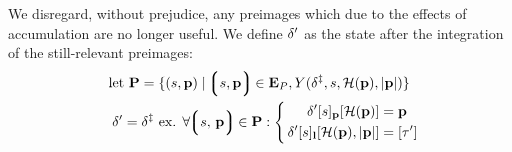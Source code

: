 We disregard, without prejudice, any preimages which due to the effects of accumulation are no longer useful. We define $\delta'$ as the state after the integration of the still-relevant preimages:
\begin{align}
  \using \mathbf{P} = \{
    (s, \mathbf{p})
    \mid
      \tup{s, \mathbf{p}} \in \xtpreimages, Y(\accountspostxfer, s, \blake(\mathbf{p}), \len{\mathbf{p}})
    \}\\
  \accountspostpreimage = \accountspostxfer \text{ ex. } \forall \tup{s,\,\mathbf{p}} \in \mathbf{P} : \left\{\,\begin{aligned}
      \quad\accountspostpreimage[s]_\mathbf{p}[\blake(\mathbf{p})] &= \mathbf{p} \\
      \accountspostpreimage[s]_\mathbf{l}[\blake(\mathbf{p}), \len{\mathbf{p}}] &= [\thetime']
    \end{aligned}\right.\!\!\!\!
\end{align}
